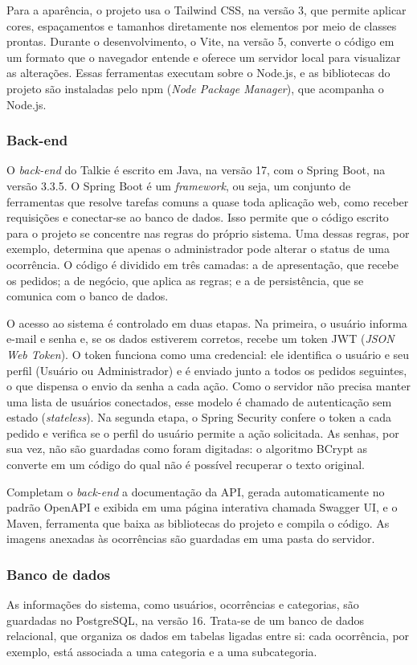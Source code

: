 \documentclass[12pt,a4paper]{article}
\begin{document}
Para a aparência, o projeto usa o Tailwind CSS, na versão 3, que permite aplicar cores, espaçamentos e tamanhos diretamente nos elementos por meio de classes prontas. Durante o desenvolvimento, o Vite, na versão 5, converte o código em um formato que o navegador entende e oferece um servidor local para visualizar as alterações. Essas ferramentas executam sobre o Node.js, e as bibliotecas do projeto são instaladas pelo npm (\textit{Node Package Manager}), que acompanha o Node.js.

\subsubsection{Back-end}
O \textit{back-end} do Talkie é escrito em Java, na versão 17, com o Spring Boot, na versão 3.3.5. O Spring Boot é um \textit{framework}, ou seja, um conjunto de ferramentas que resolve tarefas comuns a quase toda aplicação web, como receber requisições e conectar-se ao banco de dados. Isso permite que o código escrito para o projeto se concentre nas regras do próprio sistema. Uma dessas regras, por exemplo, determina que apenas o administrador pode alterar o status de uma ocorrência. O código é dividido em três camadas: a de apresentação, que recebe os pedidos; a de negócio, que aplica as regras; e a de persistência, que se comunica com o banco de dados.

O acesso ao sistema é controlado em duas etapas. Na primeira, o usuário informa e-mail e senha e, se os dados estiverem corretos, recebe um token JWT (\textit{JSON Web Token}). O token funciona como uma credencial: ele identifica o usuário e seu perfil (Usuário ou Administrador) e é enviado junto a todos os pedidos seguintes, o que dispensa o envio da senha a cada ação. Como o servidor não precisa manter uma lista de usuários conectados, esse modelo é chamado de autenticação sem estado (\textit{stateless}). Na segunda etapa, o Spring Security confere o token a cada pedido e verifica se o perfil do usuário permite a ação solicitada. As senhas, por sua vez, não são guardadas como foram digitadas: o algoritmo BCrypt as converte em um código do qual não é possível recuperar o texto original.

Completam o \textit{back-end} a documentação da API, gerada automaticamente no padrão OpenAPI e exibida em uma página interativa chamada Swagger UI, e o Maven, ferramenta que baixa as bibliotecas do projeto e compila o código. As imagens anexadas às ocorrências são guardadas em uma pasta do servidor.

\subsubsection{Banco de dados}
As informações do sistema, como usuários, ocorrências e categorias, são guardadas no PostgreSQL, na versão 16. Trata-se de um banco de dados relacional, que organiza os dados em tabelas ligadas entre si: cada ocorrência, por exemplo, está associada a uma categoria e a uma subcategoria.
\end{document}
